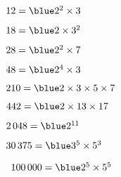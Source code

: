   \begin{colenumerate}{2}
      \item $12 =\blue 2^2\times3$
      \item $18 =\blue 2\times3^2$
      \item $28 =\blue 2^2\times7$
      \item $48 =\blue 2^4\times3$
      \item $210 =\blue 2\times3\times5\times7$
      \item $442 =\blue 2\times13\times17$
      \item $2\,048 =\blue 2^{11}$
      \item $30\,375 =\blue 3^5\times5^3$
      \item \, $100\,000 =\blue 2^5\times5^5$
   \end{colenumerate}
